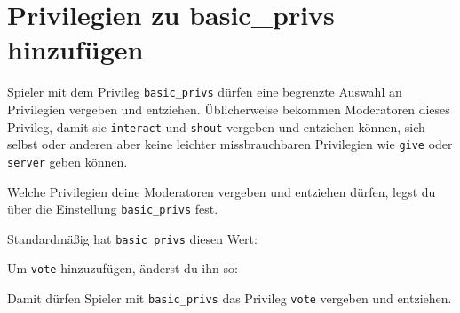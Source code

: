 \section{Privilegien zu basic\_privs
hinzufügen}\label{privilegien-zu-basic_privs-hinzufuxfcgen}

Spieler mit dem Privileg \texttt{basic\_\allowbreak{}privs} dürfen eine
begrenzte Auswahl an Privilegien vergeben und entziehen. Üblicherweise
bekommen Moderatoren dieses Privileg, damit sie \texttt{interact} und
\texttt{shout} vergeben und entziehen können, sich selbst oder anderen
aber keine leichter missbrauchbaren Privilegien wie \texttt{give} oder
\texttt{server} geben können.

Welche Privilegien deine Moderatoren vergeben und entziehen dürfen,
legst du über die Einstellung \texttt{basic\_\allowbreak{}privs} fest.

Standardmäßig hat \texttt{basic\_\allowbreak{}privs} diesen Wert:

\begin{Shaded}
\begin{Highlighting}[]
\end{Highlighting}
\end{Shaded}

Um \texttt{vote} hinzuzufügen, änderst du ihn so:

\begin{Shaded}
\begin{Highlighting}[]
\end{Highlighting}
\end{Shaded}

Damit dürfen Spieler mit \texttt{basic\_\allowbreak{}privs} das Privileg
\texttt{vote} vergeben und entziehen.
